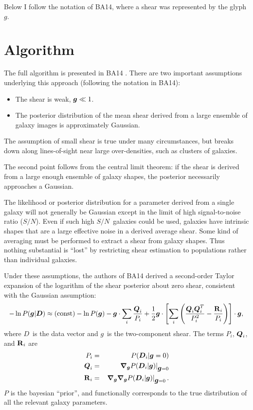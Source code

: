 \documentclass[12pt,preprint]{aastex}
\newcommand{\sn}{$S/N$}
\newcommand{\vecg}{\mbox{\boldmath $g$}}
\newcommand{\vecD}{\mbox{\boldmath $D$}}
\newcommand{\vecQ}{\mbox{\boldmath $Q$}}
\newcommand{\matR}{\mbox{$\bf R$}}
\newcommand{\bnabg}{ \boldsymbol{\nabla_g}}
\begin{document}
Below I follow the notation of BA14, where a shear was represented by the
glyph \vecg.

\section{Algorithm} \label{sec:algo}

The full algorithm is presented in BA14 .  There are two important assumptions
underlying this approach (following the notation in BA14):

\begin{itemize}

    \item The shear is weak, $\vecg \ll 1$.

    \item The posterior distribution of the mean shear derived from a large
        ensemble of galaxy images is approximately Gaussian.

\end{itemize}

The assumption of small shear is true under many circumstances, but breaks
down along lines-of-sight near large over-densities, such as clusters of
galaxies.

The second point follows from the central limit theorem: if the shear is
derived from a large enough ensemble of galaxy shapes, the posterior
necessarily approaches a Gaussian.

The likelihood or posterior distribution for a parameter derived from a single
galaxy will not generally be Gaussian except in the limit of high
signal-to-noise ratio (\sn). Even if such high \sn\ galaxies could be used,
galaxies have intrinsic shapes that are a large effective noise in a derived
average shear.  Some kind of averaging must be performed to extract a shear
from galaxy shapes.  Thus nothing substantial is ``lost'' by restricting shear
estimation to populations rather than individual galaxies.  

Under these assumptions, the authors of BA14 derived a second-order Taylor
expansion of the logarithm of the shear posterior about zero shear, consistent
with the Gaussian assumption:
\begin{equation} \label{eq:pexpand}
-\ln P(\vecg | \vecD) \approx {(\rm const)} - \ln P(\vecg) - \vecg \cdot \sum_i
    \frac{\vecQ_i}{P_i}
    + \frac{1}{2} \vecg \cdot \left[ \sum_i \left(\frac{\vecQ_i \vecQ^T_i}{P_i^2}
    - \frac{\matR_i}{P_i}\right) \right] \cdot \vecg,
\end{equation}
where \vecD\ is the data vector and \vecg\ is the two-component shear.  The
terms $P_i$, $\vecQ_i$, and $\matR_i$ are 
\begin{eqnarray} \label{eq:pqrdef}
P_i     & = & P(\vecD_i | \vecg=0) \nonumber \\
\vecQ_i & = & \left. \bnabg P(\vecD_i | \vecg)\right|_{\vecg=0} \\
\matR_i & = & \left. \bnabg \bnabg P(\vecD_i | \vecg)\right|_{\vecg=0}. \nonumber
\end{eqnarray}
$P$ is the bayesian ``prior'', and functionally corresponds to the true
distribution of all the relevant galaxy parameters.
\end{document}
